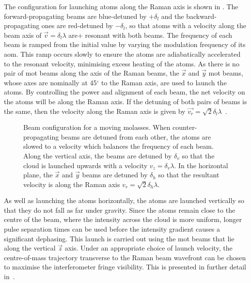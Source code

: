 The configuration for launching atoms along the Raman axis is shown in . The forward-propagating beams are blue-detuned by \(+\delta_l\) and the backward-propagating ones are red-detuned by \(-\delta_l\), so that atoms with a velocity along the beam axis of \(\vec{v} = \delta_l \lambda\) are+ resonant with both beams. The frequency of each beam is ramped from the initial value by varying the modulation frequency of its \ac{aom}. This ramp occurs slowly to ensure the atoms are adiabatically accelerated to the resonant velocity, minimising excess heating of the atoms. As there is no pair of \ac{mot} beams along the axis of the Raman beams, the \(\vec{x}\) and \(\vec{y}\) \ac{mot} beams, whose axes are nominally at 45\(^{\circ}\) to the Raman axis, are used to launch the atoms. By controlling the power and alignment of each beam, the net velocity on the atoms will be along the Raman axis. If the detuning of both pairs of beams is the same, then the velocity along the Raman axis is given by \(\vec{v_r} = \sqrt{2} \delta_l \lambda\)~\nocite{Ohshima1995}.
\begin{figure}
    \centering
    \def\svgwidth{0.6\textwidth}
    \caption[Beam configuration for a moving molasses]{Beam configuration for a moving molasses. When counter-propagating beams are detuned from each other, the atoms are slowed to a velocity which balances the frequency of each beam. Along the vertical axis, the beams are detuned by \(\delta_v\) so that the cloud is launched upwards with a velocity \(v_z = \delta_v \lambda\). In the horizontal plane, the \(\vec{x}\) and \(\vec{y}\) beams are detuned by \(\delta_h\) so that the resultant velocity is along the Raman axis \(v_r = \sqrt{2}\delta_h\lambda\). }
    \label{fig:moving_molasses}
\end{figure}
\par\noindent
As well as launching the atoms horizontally, the atoms are launched vertically so that they do not fall as far under gravity. Since the atoms remain close to the centre of the beam, where the intensity across the cloud is more uniform, longer pulse separation times can be used before the intensity gradient causes a significant dephasing. This launch is carried out using the \ac{mot} beams that lie along the vertical \(\vec{z}\) axis. Under an appropriate choice of launch velocity, the centre-of-mass trajectory transverse to the Raman beam wavefront can be chosen to maximise the interferometer fringe visibility. This is presented in further detail in~. 
\par\noindent
